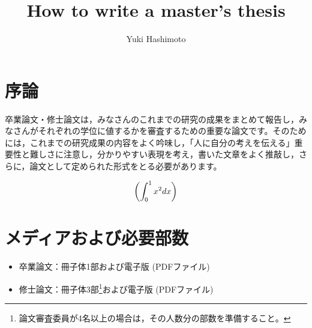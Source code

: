\documentclass[12pt]{kupaper}
\begin{document}


\title{How to write a master's thesis}
\author{Yuki Hashimoto}


\Maketitle

\setcounter{page}{1}
\tableofcontents

\chapter{序論}

卒業論文・修士論文は，みなさんのこれまでの研究の成果をまとめて報告し，みなさんがそれぞれの学位に値するかを審査するための重要な論文です。そのためには，これまでの研究成果の内容をよく吟味し，「人に自分の考えを伝える」重要性と難しさに注意し，分かりやすい表現を考え，書いた文章をよく推敲し，さらに，論文として定められた形式をとる必要があります。

\begin{equation}
	\qty( \int_0^1 x^2 dx )
\end{equation}

\chapter{メディアおよび必要部数}
\begin{itemize}
	\item 卒業論文：冊子体1部および電子版 (PDFファイル)
	\item 修士論文：冊子体3部\footnote{論文審査委員が4名以上の場合は，その人数分の部数を準備すること。}および電子版 (PDFファイル)
\end{itemize}
\end{document}
